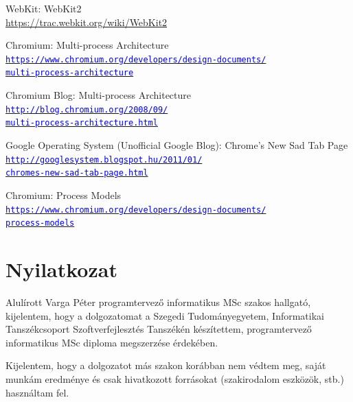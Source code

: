 \documentclass[12pt]{report}
\let\orighref\href
\renewcommand{\href}[2]{%
    \orighref{#1}{\textcolor{blue}{\texttt{#2}}}
}
\let\origurl\url
\renewcommand{\url}[1]{%
    \textcolor{blue}{\origurl{#1}}
}
\begin{document}
\begin{thebibliography}{9}
        WebKit: WebKit2 \\
        \url{https://trac.webkit.org/wiki/WebKit2}

        Chromium: Multi-process Architecture \\
        \href{https://www.chromium.org/developers/design-documents/multi-process-architecture}
        {https://www.chromium.org/developers/design-documents/\\
        multi-process-architecture}

        Chromium Blog: Multi-process Architecture \\
        \href{http://blog.chromium.org/2008/09/multi-process-architecture.html}
        {http://blog.chromium.org/2008/09/\\
        multi-process-architecture.html}

        Google Operating System (Unofficial Google Blog): Chrome's New Sad Tab Page \\
        \href{http://googlesystem.blogspot.hu/2011/01/chromes-new-sad-tab-page.html}
        {http://googlesystem.blogspot.hu/2011/01/\\
        chromes-new-sad-tab-page.html}

        Chromium: Process Models \\
        \href{https://www.chromium.org/developers/design-documents/process-models}
        {https://www.chromium.org/developers/design-documents/\\
        process-models}

\end{thebibliography}


\chapter*{Nyilatkozat}

\noindent
Alulírott Varga Péter programtervező informatikus MSc szakos hallgató, kijelentem, hogy a
dolgozatomat a Szegedi Tudományegyetem, Informatikai Tanszékcsoport Szoftverfejlesztés
Tanszékén készítettem, programtervező informatikus MSc diploma megszerzése érdekében.

Kijelentem, hogy a dolgozatot más szakon korábban nem védtem meg, saját munkám eredménye
és csak hivatkozott forrásokat (szakirodalom eszközök, stb.) használtam fel.
\end{document}
